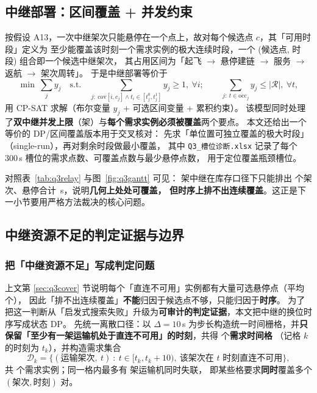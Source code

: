 \documentclass[12pt,a4paper,fontset=windows]{ctexart}
\begin{document}
\subsection{中继部署：区间覆盖 + 并发约束}
按假设 A13，一次中继架次只能悬停在一个点上，故对每个候选点 $c$，其「可用时段」定义为
至少能覆盖该时刻一个需求实例的极大连续时段，一个 (候选点, 时段) 组合即一个候选中继架次，
其占用区间为「起飞 $\to$ 悬停建链 $\to$ 服务 $\to$ 返航 $\to$ 架次周转」。
于是中继部署等价于
\begin{equation}
\min\ \sum_j y_j \quad\text{s.t.}\quad
\sum_{j:\ \mathrm{cov}[i,c_j]\wedge t_i\in[t^0_j,t^1_j]} y_j\ge1,\ \forall i;\qquad
\sum_{j:\ t\in\mathrm{occ}_j} y_j\le |\mathcal{R}|,\ \forall t,
\end{equation}
用 CP-SAT 求解（布尔变量 $y_j$ + 可选区间变量 + 累积约束）。
该模型同时处理了\textbf{双中继并发上限}（\RelayN 架）与\textbf{每个需求实例必须被覆盖}两个要点。
本文还给出一个等价的 DP/区间覆盖版本用于交叉核对：
先求「单位置可独立覆盖的极大时段」（single-run），再对剩余时段做最小覆盖，
其中 \texttt{Q3\_槽位诊断.xlsx} 记录了每个 300\,s 槽位的需求点数、可覆盖点数与最少悬停点数，
用于定位覆盖瓶颈槽位。

对照表~\ref{tab:q3relay} 与图~\ref{fig:q3gantt} 可见：\RelayN{} 架中继在库存口径下只能排出
\QthreeRelaySorties{} 个架次、悬停合计 \QthreeRelayHoverLike\,s，说明\textbf{几何上处处可覆盖，
但时序上排不出连续覆盖}。这正是下一小节要用严格方法裁决的核心问题。

\subsection{中继资源不足的判定证据与边界}\label{sec:q3infeasible}
\subsubsection{把「中继资源不足」写成判定问题}
上文第 \ref{sec:q3cover} 节说明每个「直连不可用」实例都有大量可选悬停点（平均 \QthreeDpMeanPts{} 个），
因此「排不出连续覆盖」\textbf{不能}归因于候选点不够，只能归因于\textbf{时序}。
为了把这一判断从「启发式搜索失败」升级为\textbf{可审计的判定证据}，本文把中继的换位时序写成状态 DP。
先统一离散口径：以 $\Delta=10$\,s 为步长构造统一时间栅格，并\textbf{只保留「至少有一架运输机处于直连不可用」的时刻}，共得 \QthreeDpCells{} 个\textbf{需求时间格}
（记格 $k$ 的时刻为 $t_k$），并构造需求集合
\begin{equation}
\mathcal{D}_k=\Big\{(\text{运输架次},\ t)\ :\ t\in[t_k,t_k+10),\ \text{该架次在 }t\text{ 时刻直连不可用}\Big\},
\end{equation}
共 \QthreeDpInstances{} 个需求实例；同一格内最多有 \QthreeDpPeakConcurrent{} 架运输机同时失联，
即某些格要求\textbf{同时}覆盖多个 $(\text{架次},\text{时刻})$ 对。
\end{document}
